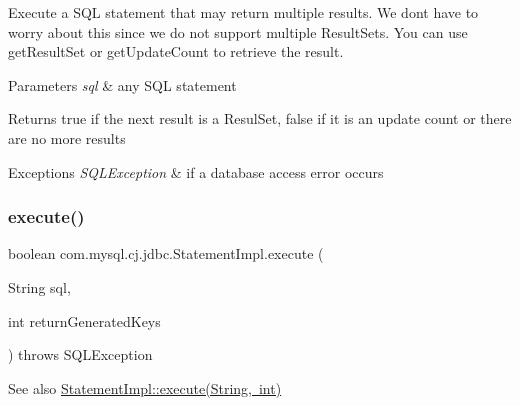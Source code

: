 Execute a S\+QL statement that may return multiple results. We don\textquotesingle{}t have to worry about this since we do not support multiple Result\+Sets. You can use get\+Result\+Set or get\+Update\+Count to retrieve the result.


\begin{DoxyParams}{Parameters}
{\em sql} & any S\+QL statement\\
\hline
\end{DoxyParams}
\begin{DoxyReturn}{Returns}
true if the next result is a Resul\+Set, false if it is an update count or there are no more results
\end{DoxyReturn}

\begin{DoxyExceptions}{Exceptions}
{\em S\+Q\+L\+Exception} & if a database access error occurs \\
\hline
\end{DoxyExceptions}
\mbox{\label{classcom_1_1mysql_1_1cj_1_1jdbc_1_1_statement_impl_a3a037fac1a8f37129b0eab24203b73f9}} 
\subsubsection{\texorpdfstring{execute()}{execute()}\hspace{0.1cm}{\footnotesize\ttfamily [2/4]}}
{\footnotesize\ttfamily boolean com.\+mysql.\+cj.\+jdbc.\+Statement\+Impl.\+execute (\begin{DoxyParamCaption}\item[{String}]{sql,  }\item[{int}]{return\+Generated\+Keys }\end{DoxyParamCaption}) throws S\+Q\+L\+Exception}

\begin{DoxySeeAlso}{See also}
\mbox{\hyperlink{classcom_1_1mysql_1_1cj_1_1jdbc_1_1_statement_impl_a3a037fac1a8f37129b0eab24203b73f9}{Statement\+Impl\+::execute(\+String, int)}} 
\end{DoxySeeAlso}
\mbox{\label{classcom_1_1mysql_1_1cj_1_1jdbc_1_1_statement_impl_ae74dd4c72023e709b23c9ea71ca1678a}} 
